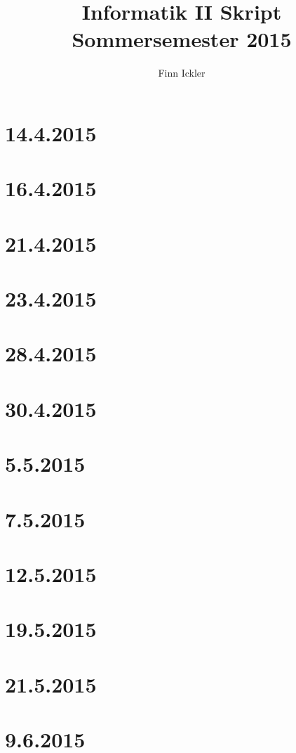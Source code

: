 \documentclass[a4paper,12pt,twoside]{article}
\author{Finn Ickler}
\title{Informatik II Skript Sommersemester 2015}
\begin{document}
\renewcommand{\underline}[1]{\emph{#1}}
\renewcommand{\uline}[1]{\emph{#1}}
\maketitle
\tableofcontents
\lstlistoflistings
\newpage
\section{14.4.2015}

\section{16.4.2015}

\section{21.4.2015}

\section{23.4.2015}

\section{28.4.2015}

\section{30.4.2015}

\section{5.5.2015}

\section{7.5.2015}

\pagebreak
\section{12.5.2015}

\section{19.5.2015}

\section{21.5.2015}

\section{9.6.2015}

\end{document}
